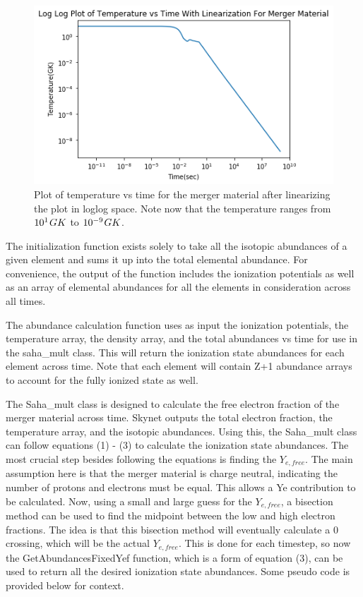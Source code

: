 \documentclass[11pt,a4paper]{article}
\begin{document}
\begin{figure}[h!]
  \includegraphics[width=1\textwidth]{temptime.png}
  \caption{Plot of temperature vs time for the merger material after linearizing the plot in loglog space. Note now that the temperature ranges from $10^1 \hspace{.03 cm} GK$ to $10^{-9} \hspace{.03 cm} GK$.}
\end{figure} 

\vspace{1 cm}

The initialization function exists solely to take all the isotopic abundances of a given element and sums it up into the total elemental abundance. For convenience, the output of the function includes the ionization potentials as well as an array of elemental abundances for all the elements in consideration across all times. 

The abundance calculation function uses as input the ionization potentials, the temperature array, the density array, and the total abundances vs time for use in the saha\_mult class. This will return the ionization state abundances for each element across time. Note that each element will contain Z+1 abundance arrays to account for the fully ionized state as well. 

The Saha\_mult class is designed to calculate the free electron fraction of the merger material across time. Skynet outputs the total electron fraction, the temperature array, and the isotopic abundances. Using this, the Saha\_mult class can follow equations (1) - (3) to calculate the ionization state abundances. The most crucial step besides following the equations is finding the $Y_{e,free}$. The main assumption here is that the merger material is charge neutral, indicating the number of protons and electrons must be equal. This allows a Ye contribution to be calculated. Now, using a small and large guess for the $Y_{e,free}$, a bisection method can be used to find the midpoint between the low and high electron fractions. The idea is that this bisection method will eventually calculate a 0 crossing, which will be the actual $Y_{e,free}$. This is done for each timestep, so now the GetAbundancesFixedYef function, which is a form of equation (3), can be used to return all the desired ionization state abundances. Some pseudo code is provided below for context.\\
\end{document}

